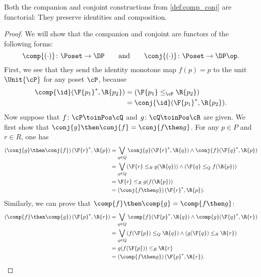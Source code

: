 \begin{lemma}
\label{prop:comp_conj}
Both the companion and conjoint constructions from \cref{def:comp_conj} are functorial: They preserve identities and composition.
\end{lemma}
\begin{proof}
We will show that the companion and conjoint are functors of the following forms:
\begin{equation}
\comp{(\cdot)}\colon\Poset\to\DP
\qquad\text{and}\qquad
\conj{(\cdot)}\colon\Poset\to\DP\op.
\end{equation}
First, we see that they send the identity monotone map $f(p)=p$ to the unit $\Unit{\cP }$ for any poset $\cP $, because 
\begin{equation}
    \begin{aligned}
        \comp{\id}(\F{p_1}^*,\R{p_2})&= (\F{p_1} \leq_{\cP} \R{p_2})\\
        &=\conj{\id}(\F{p_1}^*,\R{p_2}).
    \end{aligned}
\end{equation}
\noindent Now suppose that $f\colon  \cP \toinPos \cQ $ and $g\colon \cQ \toinPos \cR$ are given. We first show that $\conj{g}\then\conj{f}=\conj{f\then g}$.
For any $p\in P$ and $r\in R$, one has
\begin{equation}
\begin{aligned}
	\left(\conj{g}\then \conj{f}\right)(\F{r}^*,\R{p})
	&=\bigvee_{q\in Q} \conj{g}(\F{r}^*,\R{q})\wedge\conj{f}(\F{q}^*,\R{p})\\
	&=\bigvee_{q\in Q} (\F{r}\leq_R g(\R{q})) \wedge (\F{q}\leq_Q f(\R{p})) \\
	&= \F{r}\leq_R g(f(\R{p}))\\
    &=\left(\conj{f\then g}\right)(\F{r}^*,\R{p}).
\end{aligned}
\end{equation}
Similarly, we can prove that $\comp{f}\then \comp{g}=\comp{f\then g}$:
\begin{equation}
    \begin{aligned}
    \left(\comp{f}\then \comp{g}\right)(\F{p}^*,\R{r})&=\bigvee_{q\in Q} \comp{f}(\F{p}^*,\R{q})\wedge\comp{g}(\F{q}^*,\R{r})\\
    &=\bigvee_{q\in Q} (f(\F{p})\leq_Q \R{q})\wedge (g(\F{q})\leq_R \R{r})\\
    &=g(f(\F{p}))\leq_R \R{r}\\
    &=\left(\comp{f\then g}\right)(\F{p}^*,\R{r}).
    \end{aligned}
\end{equation}
\end{proof}


